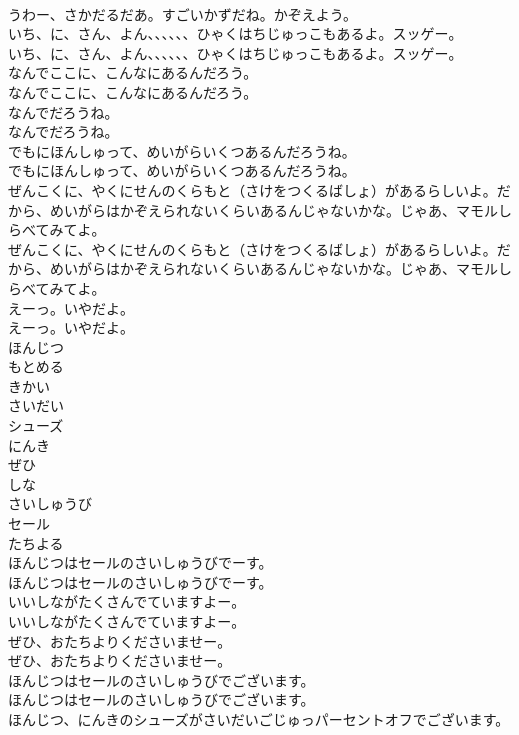 \documentclass[8pt]{extreport}
\begin{document}
\begin{CJK}{UTF8}{min}
\\	うわー、さかだるだあ。すごいかずだね。かぞえよう。
\\	いち、に、さん、よん、、、、、、ひゃくはちじゅっこもあるよ。スッゲー。
\\	いち、に、さん、よん、、、、、、ひゃくはちじゅっこもあるよ。スッゲー。
\\	なんでここに、こんなにあるんだろう。
\\	なんでここに、こんなにあるんだろう。
\\	なんでだろうね。
\\	なんでだろうね。
\\	でもにほんしゅって、めいがらいくつあるんだろうね。
\\	でもにほんしゅって、めいがらいくつあるんだろうね。
\\	ぜんこくに、やくにせんのくらもと（さけをつくるばしょ）があるらしいよ。だから、めいがらはかぞえられないくらいあるんじゃないかな。じゃあ、マモルしらべてみてよ。
\\	ぜんこくに、やくにせんのくらもと（さけをつくるばしょ）があるらしいよ。だから、めいがらはかぞえられないくらいあるんじゃないかな。じゃあ、マモルしらべてみてよ。
\\	えーっ。いやだよ。
\\	えーっ。いやだよ。
\\	ほんじつ
\\	もとめる
\\	きかい
\\	さいだい
\\	シューズ
\\	にんき
\\	ぜひ
\\	しな
\\	さいしゅうび
\\	セール
\\	たちよる
\\	ほんじつはセールのさいしゅうびでーす。
\\	ほんじつはセールのさいしゅうびでーす。
\\	いいしながたくさんでていますよー。
\\	いいしながたくさんでていますよー。
\\	ぜひ、おたちよりくださいませー。
\\	ぜひ、おたちよりくださいませー。
\\	ほんじつはセールのさいしゅうびでございます。
\\	ほんじつはセールのさいしゅうびでございます。
\\	ほんじつ、にんきのシューズがさいだいごじゅっパーセントオフでございます。

\end{CJK}
\end{document}
